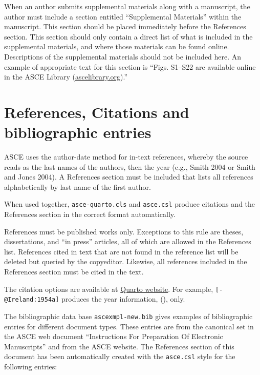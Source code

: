 \documentclass[NewProceedings, InsideFigs,LineNumbers]{asce-quarto}
\begin{document}
When an author submits supplemental materials along with a manuscript,
the author must include a section entitled ``Supplemental Materials''
within the manuscript. This section should be placed immediately before
the References section. This section should only contain a direct list
of what is included in the supplemental materials, and where those
materials can be found online. Descriptions of the supplemental
materials should not be included here. An example of appropriate text
for this section is ``Figs. S1--S22 are available online in the ASCE
Library (\href{http://ascelibrary.org/}{ascelibrary.org}).''

\section{References, Citations and bibliographic
entries}\label{references-citations-and-bibliographic-entries}

ASCE uses the author-date method for in-text references, whereby the
source reads as the last names of the authors, then the year (e.g.,
Smith 2004 or Smith and Jones 2004). A References section must be
included that lists all references alphabetically by last name of the
first author.

When used together, \texttt{asce-quarto.cls} and \texttt{asce.csl}
produce citations and the References section in the correct format
automatically.

References must be published works only. Exceptions to this rule are
theses, dissertations, and ``in press'' articles, all of which are
allowed in the References list. References cited in text that are not
found in the reference list will be deleted but queried by the
copyeditor. Likewise, all references included in the References section
must be cited in the text.

The citation options are available at
\href{https://quarto.org/docs/authoring/citations.html}{Quarto website}.
For example, \texttt{{[}-@Ireland:1954a{]}} produces the year
information, (), only.

The bibliographic data base \texttt{ascexmpl-new.bib} gives examples of
bibliographic entries for different document types. These entries are
from the canonical set in the ASCE web document ``Instructions For
Preparation Of Electronic Manuscripts'' and from the ASCE website. The
References section of this document has been automatically created with
the \texttt{asce.csl} style for the following entries:
\end{document}
